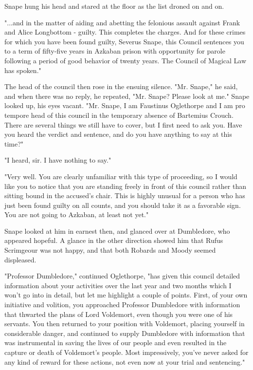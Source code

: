 \documentclass[a4paper,11pt]{article}
\begin{document}
Snape hung his head and stared at the floor as the list droned on and on.

"...and in the matter of aiding and abetting the felonious assault against Frank and Alice Longbottom - guilty. This completes the charges. And for these crimes for which you have been found guilty, Severus Snape, this Council sentences you to a term of fifty-five years in Azkaban prison with opportunity for parole following a period of good behavior of twenty years. The Council of Magical Law has spoken."

The head of the council then rose in the ensuing silence. "Mr. Snape," he said, and when there was no reply, he repeated, "Mr. Snape? Please look at me." Snape looked up, his eyes vacant. "Mr. Snape, I am Faustinus Oglethorpe and I am pro tempore head of this council in the temporary absence of Bartemius Crouch. There are several things we still have to cover, but I first need to ask you. Have you heard the verdict and sentence, and do you have anything to say at this time?"

"I heard, sir. I have nothing to say."

"Very well. You are clearly unfamiliar with this type of proceeding, so I would like you to notice that you are standing freely in front of this council rather than sitting bound in the accused's chair. This is highly unusual for a person who has just been found guilty on all counts, and you should take it as a favorable sign. You are not going to Azkaban, at least not yet."

Snape looked at him in earnest then, and glanced over at Dumbledore, who appeared hopeful. A glance in the other direction showed him that Rufus Scrimgeour was not happy, and that both Robards and Moody seemed displeased.

"Professor Dumbledore," continued Oglethorpe, "has given this council detailed information about your activities over the last year and two months which I won't go into in detail, but let me highlight a couple of points. First, of your own initiative and volition, you approached Professor Dumbledore with information that thwarted the plans of Lord Voldemort, even though you were one of his servants. You then returned to your position with Voldemort, placing yourself in considerable danger, and continued to supply Dumbledore with information that was instrumental in saving the lives of our people and even resulted in the capture or death of Voldemort's people. Most impressively, you've never asked for any kind of reward for these actions, not even now at your trial and sentencing."
\end{document}
